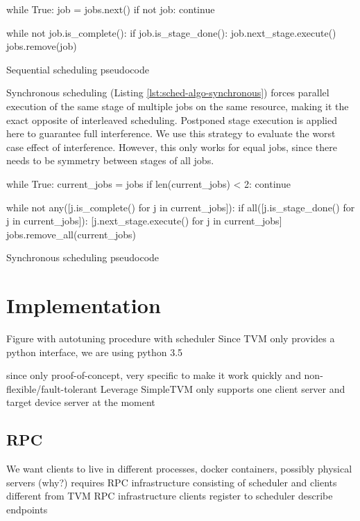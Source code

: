 \begin{listing}
\begin{pythoncode}
while True:
    job = jobs.next()
    if not job:
        continue

    while not job.is_complete():
        if job.is_stage_done():
            job.next_stage.execute()
    jobs.remove(job)
\end{pythoncode}
\unskip
\caption{Sequential scheduling pseudocode}
\label{lst:sched-algo-sequential}
\end{listing}

Synchronous scheduling (Listing \ref{lst:sched-algo-synchronous}) forces parallel execution of the same stage of multiple jobs on the same resource, making it the exact opposite of interleaved scheduling. Postponed stage execution is applied here to guarantee full interference. We use this strategy to evaluate the worst case effect of interference. However, this only works for equal jobs, since there needs to be symmetry between stages of all jobs.

\begin{listing}
\begin{pythoncode}
while True:
    current_jobs = jobs
    if len(current_jobs) < 2:
        continue

    while not any([j.is_complete() for j in current_jobs]):
        if all([j.is_stage_done() for j in current_jobs]):
            [j.next_stage.execute() for j in current_jobs]
    jobs.remove_all(current_jobs)
\end{pythoncode}
\unskip
\caption{Synchronous scheduling pseudocode}
\label{lst:sched-algo-synchronous}
\end{listing}

\section{Implementation}
Figure with autotuning procedure with scheduler
Since TVM only provides a python interface, we are using python 3.5

since only proof-of-concept, very specific to make it work quickly and non-flexible/fault-tolerant
Leverage SimpleTVM
only supports one client server and target device server at the moment


\subsection{RPC}
We want clients to live in different processes, docker containers, possibly physical servers (why?)
requires RPC infrastructure consisting of scheduler and clients
different from TVM RPC infrastructure
clients register to scheduler
describe endpoints

